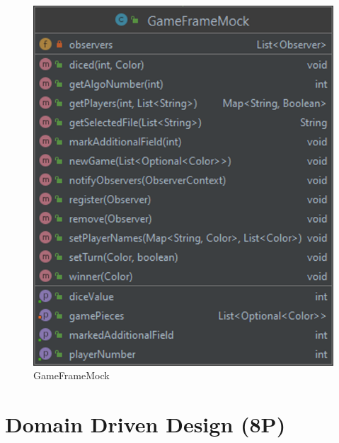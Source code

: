 \begin{figure}[htbp]
\centering
\centerline{\includegraphics[scale=.5]{gameframemock}}
\caption{GameFrameMock}
\label{fig:gameframemock}
\end{figure}

\newpage
\titlespacing*{\chapter}{0pt}{-30mm}{10pt}
  
\chapter{Domain Driven Design (8P)}
\pagestyle{scrheadings}
\clearscrheadfoot
{}
\setcounter{page}{25}
\ofoot[\pagemark]{\pagemark}
\onehalfspacing

